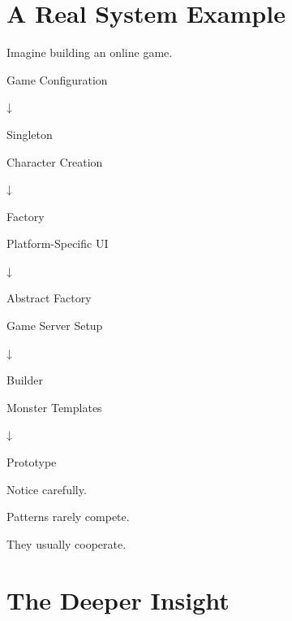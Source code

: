 \documentclass[11pt,a4paper]{book}
\begin{document}

\section{A Real System Example}

Imagine building an online game.


Game Configuration

↓

Singleton


Character Creation

↓

Factory


Platform-Specific UI

↓

Abstract Factory


Game Server Setup

↓

Builder


Monster Templates

↓

Prototype


Notice carefully.


Patterns rarely compete.


They usually cooperate.


\section{The Deeper Insight}
\end{document}
